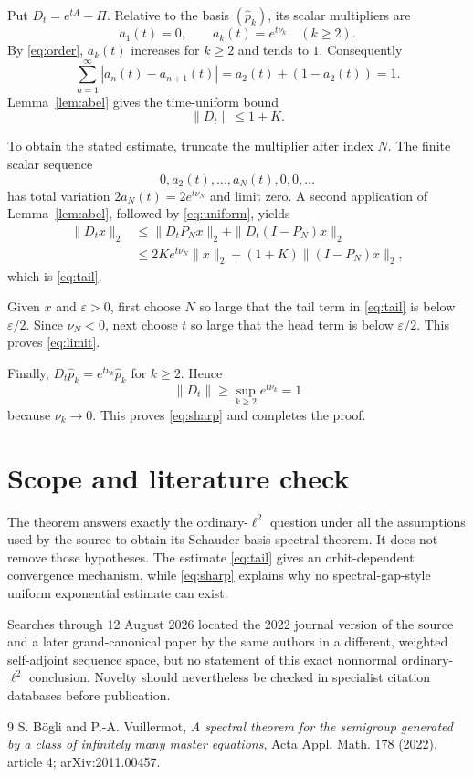 \documentclass[11pt]{article}
\begin{document}
Put $D_t=e^{tA}-\Pi$.  Relative to the basis $(\widehat p_k)$, its scalar
multipliers are
\[
 a_1(t)=0,\qquad a_k(t)=e^{t\nu_k}\quad(k\geq2).
\]
By \eqref{eq:order}, $a_k(t)$ increases for $k\geq2$ and tends to $1$.
Consequently
\[
 \sum_{n=1}^{\infty}|a_n(t)-a_{n+1}(t)|
 =a_2(t)+(1-a_2(t))=1.
\]
Lemma~\ref{lem:abel} gives the time-uniform bound
\begin{equation}\label{eq:uniform}
 \|D_t\|\leq1+K.
\end{equation}

To obtain the stated estimate, truncate the multiplier after index $N$.
The finite scalar sequence
\[
 0,a_2(t),\ldots,a_N(t),0,0,\ldots
\]
has total variation $2a_N(t)=2e^{t\nu_N}$ and limit zero.  A second application
of Lemma~\ref{lem:abel}, followed by \eqref{eq:uniform}, yields
\begin{align*}
 \|D_tx\|_2
 &\leq\|D_tP_Nx\|_2+\|D_t(I-P_N)x\|_2\\
 &\leq2K e^{t\nu_N}\|x\|_2+(1+K)\|(I-P_N)x\|_2,
\end{align*}
which is \eqref{eq:tail}.

Given $x$ and $\varepsilon>0$, first choose $N$ so large that the tail term
in \eqref{eq:tail} is below $\varepsilon/2$.  Since $\nu_N<0$, next choose
$t$ so large that the head term is below $\varepsilon/2$.  This proves
\eqref{eq:limit}.

Finally, $D_t\widehat p_k=e^{t\nu_k}\widehat p_k$ for $k\geq2$.  Hence
\[
 \|D_t\|\geq\sup_{k\geq2}e^{t\nu_k}=1
\]
because $\nu_k\to0$.  This proves \eqref{eq:sharp} and completes the proof.

\section{Scope and literature check}

The theorem answers exactly the ordinary-$\ell^2$ question under all the
assumptions used by the source to obtain its Schauder-basis spectral theorem.
It does not remove those hypotheses.  The estimate \eqref{eq:tail} gives an
orbit-dependent convergence mechanism, while \eqref{eq:sharp} explains why
no spectral-gap-style uniform exponential estimate can exist.

Searches through 12 August 2026 located the 2022 journal version of the
source and a later grand-canonical paper by the same authors in a different,
weighted self-adjoint sequence space, but no statement of this exact
nonnormal ordinary-$\ell^2$ conclusion.  Novelty should nevertheless be
checked in specialist citation databases before publication.

\begin{thebibliography}{9}
S. B\"ogli and P.-A. Vuillermot,
\emph{A spectral theorem for the semigroup generated by a class of infinitely
many master equations}, Acta Appl. Math. 178 (2022), article 4;
arXiv:2011.00457.
\end{thebibliography}
\end{document}
